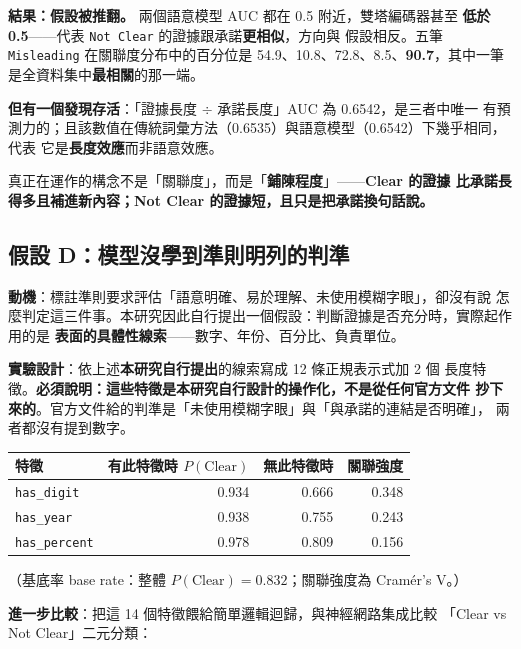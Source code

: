 \documentclass[11pt,a4paper]{ctexart}
\newcommand{\fieldname}[1]{\texttt{#1}}
\begin{document}
\textbf{結果：假設被推翻。} 兩個語意模型 AUC 都在 0.5 附近，雙塔編碼器甚至
\textbf{低於 0.5}——代表 \fieldname{Not Clear} 的證據跟承諾\textbf{更相似}，方向與
假設相反。五筆 \fieldname{Misleading} 在關聯度分布中的百分位是
54.9、10.8、72.8、8.5、\textbf{90.7}，其中一筆是全資料集中\textbf{最相關}的那一端。

\textbf{但有一個發現存活}：「證據長度 $\div$ 承諾長度」AUC 為 0.6542，是三者中唯一
有預測力的；且該數值在傳統詞彙方法（0.6535）與語意模型（0.6542）下幾乎相同，代表
它是\textbf{長度效應}而非語意效應。

\begin{tcolorbox}[colback=green!5, colframe=green!45, title=衍生結論]
真正在運作的構念不是「關聯度」，而是「\textbf{鋪陳程度}」——\textbf{Clear 的證據
比承諾長得多且補進新內容；Not Clear 的證據短，且只是把承諾換句話說。}
\end{tcolorbox}

\subsection*{假設 D：模型沒學到準則明列的判準}

\textbf{動機}：標註準則要求評估「語意明確、易於理解、未使用模糊字眼」，卻沒有說
怎麼判定這三件事。本研究因此自行提出一個假設：判斷證據是否充分時，實際起作用的是
\textbf{表面的具體性線索}——數字、年份、百分比、負責單位。

\textbf{實驗設計}：依上述\textbf{本研究自行提出}的線索寫成 12 條正規表示式加 2 個
長度特徵。\textbf{必須說明：這些特徵是本研究自行設計的操作化，不是從任何官方文件
抄下來的}。官方文件給的判準是「未使用模糊字眼」與「與承諾的連結是否明確」，
兩者都沒有提到數字。

\begin{table}[h]
\centering
\small
\begin{tabular}{@{}lrrr@{}}
\toprule
特徵 & 有此特徵時 $P(\text{Clear})$ & 無此特徵時 & 關聯強度 \\
\midrule
\fieldname{has\_digit}   & 0.934 & 0.666 & 0.348 \\
\fieldname{has\_year}    & 0.938 & 0.755 & 0.243 \\
\fieldname{has\_percent} & 0.978 & 0.809 & 0.156 \\
\bottomrule
\end{tabular}
\end{table}

（基底率 base rate：整體 $P(\text{Clear}) = 0.832$；關聯強度為 Cramér's V。）

\textbf{進一步比較}：把這 14 個特徵餵給簡單邏輯迴歸，與神經網路集成比較
「Clear vs Not Clear」二元分類：
\end{document}
